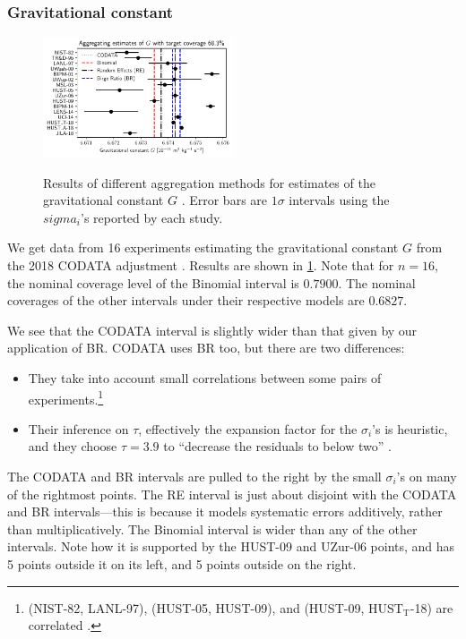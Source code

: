 \documentclass[letterpaper,12pt]{article}
\begin{document}
\subsubsection{Gravitational constant}\label{gravitational-constant}

\begin{figure}[htpb]
\centering
\includegraphics[width=0.5\textwidth]{figs/G0.pdf}
\label{fig:G}
\caption{Results of different aggregation methods for estimates of the gravitational constant $G$ \cite[Table XXIX]{tiesinga2021codata}. Error bars are $1\sigma$ intervals using the $sigma_i$'s reported by each study.}
\end{figure}


We get data from 16 experiments estimating the gravitational constant $G$ from the 2018 CODATA adjustment \citep[Table XXIX]{tiesinga2021codata}. Results are shown in \ref{fig:G}. Note that for $n=16$, the nominal coverage level of the Binomial interval is $0.7900$. The nominal coverages of the other intervals under their respective models are $0.6827$.

We see that the CODATA interval is slightly wider than that given by our application of BR. CODATA uses BR too, but there are two differences:

\begin{itemize}
\item
  They take into account small correlations between some pairs of experiments.\footnote{(NIST-82, LANL-97), (HUST-05, HUST-09), and (HUST-09, HUST$_\text{T}$-18) are correlated \citep{tiesinga2021codata}.}
\item
  Their inference on $\tau$, effectively the expansion factor for the $\sigma_i$'s is heuristic, and they choose $\tau=3.9$ to ``decrease the residuals to below two'' \citep{tiesinga2021codata}.
\end{itemize}

The CODATA and BR intervals are pulled to the right by the small $\sigma_i$'s on many of the rightmost points. The RE interval is just about disjoint with the CODATA and BR intervals---this is because it models systematic errors additively, rather than multiplicatively. The Binomial interval is wider than any of the other intervals. Note how it is supported by the HUST-09 and UZur-06 points, and has 5 points outside it on its left, and 5 points outside on the right.
\end{document}

